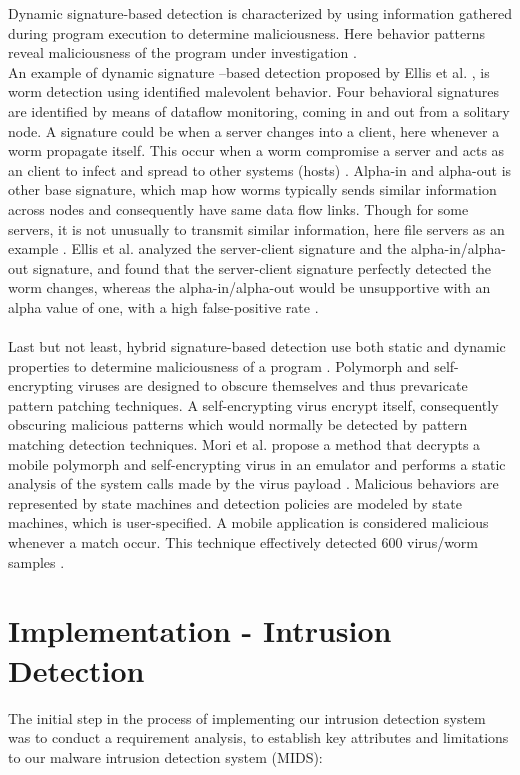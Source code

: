 \documentclass[12pt]{article} %
\begin{document}
Dynamic signature-based detection is characterized by using information gathered during program execution to determine maliciousness. Here behavior patterns reveal maliciousness of the program under investigation \cite{idika2007survey}. \\
An example of dynamic signature –based detection proposed by Ellis et al. \cite{idika2007survey}, is worm detection using identified malevolent behavior. Four behavioral signatures are identified by means of dataflow monitoring, coming in and out from a solitary node. A signature could be when a server changes into a client, here whenever a worm propagate itself. This occur when a worm compromise a server and acts as an client to infect and spread to other systems (hosts) \cite{idika2007survey}. Alpha-in and alpha-out is other base signature, which map how worms typically sends similar information across nodes and consequently have same data flow links. Though for some servers, it is not unusually to transmit similar information, here file servers as an example \cite{idika2007survey}. Ellis et al. \cite{idika2007survey} analyzed the server-client signature and the alpha-in/alpha-out signature, and found that the server-client signature perfectly detected the worm changes, whereas the alpha-in/alpha-out would be unsupportive with an alpha value of one, with a high false-positive rate \cite{idika2007survey}. \\ \\
Last but not least, hybrid signature-based detection use both static and dynamic properties to determine maliciousness of a program \cite{idika2007survey}. Polymorph and self-encrypting viruses are designed to obscure themselves and thus prevaricate pattern patching techniques. A self-encrypting virus encrypt itself, consequently obscuring malicious patterns which would normally be detected by pattern matching detection techniques. Mori et al. \cite{idika2007survey} propose a method that decrypts a mobile polymorph and self-encrypting virus in an emulator and performs a static analysis of the system calls made by the virus payload \cite{idika2007survey}. Malicious behaviors are represented by state machines and detection policies are modeled by state machines, which is user-specified. A mobile application is considered malicious whenever a match occur. This technique effectively detected 600 virus/worm samples \cite{idika2007survey}.
\section{Implementation - Intrusion Detection}
The initial step in the process of implementing our intrusion detection system was to conduct a requirement analysis, to establish key attributes and limitations to our malware intrusion detection system (MIDS):
\end{document}
